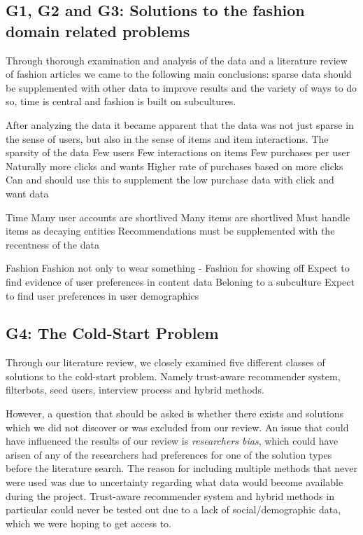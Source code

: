 \subsection{G1, G2 and G3: Solutions to the fashion domain related problems}
\label{sec:fashion-discussion}

Through thorough examination and analysis of the data and a literature review of fashion articles we came to the following main conclusions: sparse data should be supplemented with other data to improve results and the variety of ways to do so, time is central and fashion is built on subcultures.

After analyzing the data it became apparent that the data was not just sparse in the sense of users, but also in the sense of items and item interactions.
The sparsity of the data
    Few users
    Few interactions on items
    Few purchases per user
        Naturally more clicks and wants
            Higher rate of purchases based on more clicks
                Can and should use this to supplement the low purchase data with click and want data

Time
    Many user accounts are shortlived
    Many items are shortlived
        Must handle items as decaying entities
            Recommendations must be supplemented with the recentness of the data

Fashion
    Fashion not only to wear something - Fashion for showing off
        Expect to find evidence of user preferences in content data
    Beloning to a subculture
        Expect to find user preferences in user demographics




\subsection{G4: The Cold-Start Problem}
\label{sec:cold-start-discussion}

Through our literature review, we closely examined five different classes of solutions to the cold-start problem. Namely trust-aware recommender system, filterbots, seed users, interview process and hybrid methods.

However, a question that should be asked is whether there exists and solutions which we did not discover or was excluded from our review. An issue that could have influenced the results of our review is \emph{researchers bias}, which could have arisen of any of the researchers had preferences for one of the solution types before the literature search. The reason for including multiple methods that never were used was due to uncertainty regarding what data would become available during the project. Trust-aware recommender system and hybrid methods in particular could never be tested out due to a lack of social/demographic data, which we were hoping to get access to.



